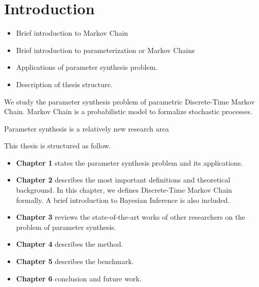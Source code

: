 \section{Introduction}

 {\color{red}
  \begin{itemize}
    \item Brief introduction to Markov Chain
    \item Brief introduction to parameterization or Markov Chains
    \item Applications of parameter synthesis problem.
    \item Description of thesis structure.
  \end{itemize}
 }
We study the parameter synthesis problem of parametric Discrete-Time Markov
Chain. Markov Chain is a probabilistic model to formalize stochastic
processes.

Parameter synthesis is a relatively new research area \cite{katoen2016probabilistic}

This thesis is structured as follow.

\begin{itemize}
  \item \textbf{Chapter 1} states the parameter synthesis problem and its applications.
  \item \textbf{Chapter 2} describes the most important definitions and
        theoretical background. In this chapter, we defines Discrete-Time Markov Chain
        formally. A brief introduction to Bayesian Inference is also included.
  \item \textbf{Chapter 3} reviews the state-of-the-art works of other researchers
        on the problem of parameter synthesis.
  \item \textbf{Chapter 4} describes the method.
  \item \textbf{Chapter 5} describes the benchmark.
  \item \textbf{Chapter 6} conclusion and future work.
\end{itemize}

